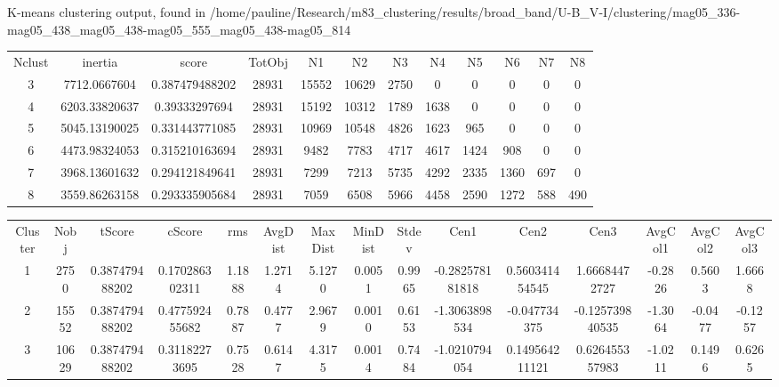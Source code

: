\documentclass{article}%
\begin{document}
%
\normalsize%
K{-}means clustering output, found in%
/home/pauline/Research/m83\_clustering/results/broad\_band/U{-}B\_V{-}I/clustering/mag05\_336{-}mag05\_438\_mag05\_438{-}mag05\_555\_mag05\_438{-}mag05\_814%
\begin{table}
\begin{tabular}{cccccccccccc}
Nclust & inertia & score & TotObj & N1 & N2 & N3 & N4 & N5 & N6 & N7 & N8 \\
3 & 7712.0667604 & 0.387479488202 & 28931 & 15552 & 10629 & 2750 & 0 & 0 & 0 & 0 & 0 \\
4 & 6203.33820637 & 0.39333297694 & 28931 & 15192 & 10312 & 1789 & 1638 & 0 & 0 & 0 & 0 \\
5 & 5045.13190025 & 0.331443771085 & 28931 & 10969 & 10548 & 4826 & 1623 & 965 & 0 & 0 & 0 \\
6 & 4473.98324053 & 0.315210163694 & 28931 & 9482 & 7783 & 4717 & 4617 & 1424 & 908 & 0 & 0 \\
7 & 3968.13601632 & 0.294121849641 & 28931 & 7299 & 7213 & 5735 & 4292 & 2335 & 1360 & 697 & 0 \\
8 & 3559.86263158 & 0.293335905684 & 28931 & 7059 & 6508 & 5966 & 4458 & 2590 & 1272 & 588 & 490 \\
\end{tabular}
\end{table}
%
\newpage%
\begin{table}
\begin{tabular}{ccccccccccccccc}
Cluster & Nobj & tScore & cScore & rms & AvgDist & MaxDist & MinDist & Stdev & Cen1 & Cen2 & Cen3 & AvgCol1 & AvgCol2 & AvgCol3 \\
1 & 2750 & 0.387479488202 & 0.170286302311 & 1.1888 & 1.2714 & 5.1270 & 0.0051 & 0.9965 & -0.282578181818 & 0.560341454545 & 1.66684472727 & -0.2826 & 0.5603 & 1.6668 \\
2 & 15552 & 0.387479488202 & 0.477592455682 & 0.7887 & 0.4777 & 2.9679 & 0.0010 & 0.6153 & -1.3063898534 & -0.047734375 & -0.125739840535 & -1.3064 & -0.0477 & -0.1257 \\
3 & 10629 & 0.387479488202 & 0.31182273695 & 0.7528 & 0.6147 & 4.3175 & 0.0014 & 0.7484 & -1.0210794054 & 0.149564211121 & 0.626455357983 & -1.0211 & 0.1496 & 0.6265 \\
\end{tabular}
\end{table}
%
\end{document}
